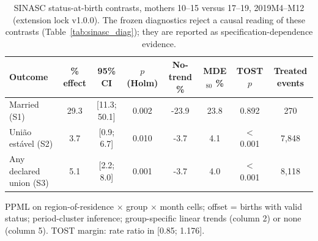 \begin{table}[!htbp]
\centering
\caption{SINASC status-at-birth contrasts, mothers 10--15 versus 17--19, 2019M4--M12 (extension lock v1.0.0). The frozen diagnostics reject a causal reading of these contrasts (Table~\ref{tab:sinasc_diag}); they are reported as specification-dependence evidence.}
\label{tab:sinasc_status}
\begingroup\small
\begin{tabular}{lccccccc}
  \hline
 Outcome & \% effect & 95\% CI & $p$ (Holm) & No-trend \% & MDE$_{80}$ \% & TOST $p$ & Treated events \\ 
  \hline
Married (S1) & 29.3 & [11.3; 50.1] & 0.002 & -23.9 & 23.8 & 0.892 &   270 \\
Uni\~ao est\'avel (S2) & 3.7 & [0.9; 6.7] & 0.010 & -3.7 & 4.1 & $<$0.001 & 7,848 \\
Any declared union (S3) & 5.1 & [2.2; 8.0] & 0.001 & -3.7 & 4.0 & $<$0.001 & 8,118 \\
  \hline
\end{tabular}
\endgroup
\par\smallskip\begingroup\footnotesize PPML on region-of-residence $\times$ group $\times$ month cells; offset = births with valid status; period-cluster inference; group-specific linear trends (column 2) or none (column 5). TOST margin: rate ratio in [0.85; 1.176].\endgroup
\end{table}

